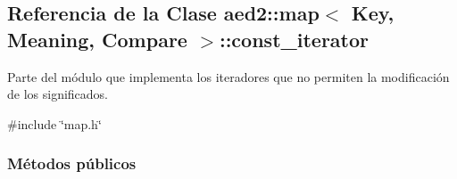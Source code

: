 \hypertarget{classaed2_1_1map_1_1const__iterator}{\subsection{\-Referencia de la \-Clase aed2\-:\-:map$<$ \-Key, \-Meaning, \-Compare $>$\-:\-:const\-\_\-iterator}
\label{classaed2_1_1map_1_1const__iterator}
}


\-Parte del módulo que implementa los iteradores que no permiten la modificación de los significados.  




{\ttfamily \#include \char`\"{}map.\-h\char`\"{}}

\subsubsection*{\-Métodos públicos}
